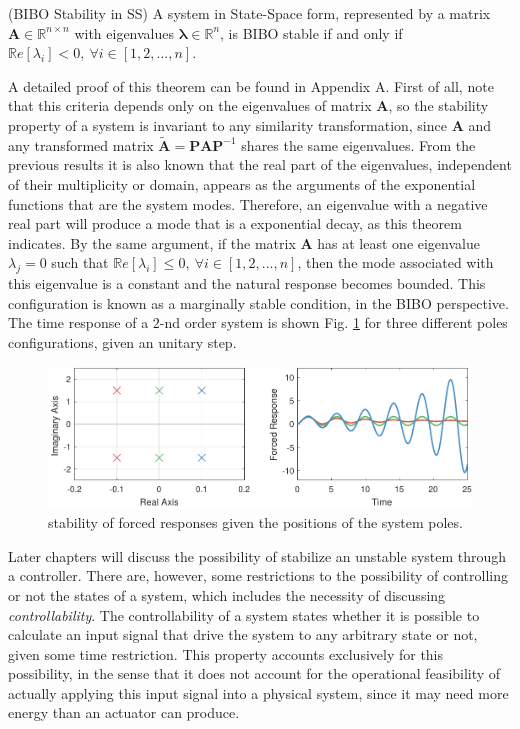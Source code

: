 \documentclass[a4paper,11pt]{book}
\numberwithin{figure}{chapter}
\numberwithin{equation}{chapter}
\numberwithin{table}{chapter}
\newtheorem{theorem}{Theorem}[chapter]
\theoremstyle{definition}
\newcounter{boxed-theorem}
\newenvironment{boxed-theorem}[1]
{\begin{shaded} \begin{theorem}{#1}}
{\end{theorem} \end{shaded}}
\newcounter{boxed-definition}
\begin{document}
\begin{boxed-theorem}{(BIBO Stability in SS)} \label{th:BIBOStab}
	A system in State-Space form, represented by a matrix $\bm{A} \in \mathbb{R}^{n \times n}$ with eigenvalues $\bm{\lambda} \in \mathbb{R}^n$, is BIBO stable if and only if $\mathbb{R}e[\lambda_i] < 0,\ \forall i \in [1,2,...,n]$.
\end{boxed-theorem}

A detailed proof of this theorem can be found in Appendix A. First of all, note that this criteria depends only on the eigenvalues of matrix $\bm{A}$, so the stability property of a system is invariant to any similarity transformation, since $\bm{A}$ and any transformed matrix $\tilde{\bm{A}} = \bm{P} \bm{A} \bm{P}^{-1}$ shares the same eigenvalues. From the previous results it is also known that the real part of the eigenvalues, independent of their multiplicity or domain, appears as the arguments of the exponential functions that are the system modes. Therefore, an eigenvalue with a negative real part will produce a mode that is a exponential decay, as this theorem indicates. By the same argument, if the matrix $\bm{A}$ has at least one eigenvalue $\lambda_j = 0$ such that $\mathbb{R}e[\lambda_i] \leq 0,\ \forall i \in [1,2,...,n]$, then the mode associated with this eigenvalue is a constant and the natural response becomes bounded. This configuration is known as a marginally stable condition, in the BIBO perspective. The time response of a $2$-nd order system is shown Fig. \ref{fig:stability01} for three different poles configurations, given an unitary step.

\begin{figure}[ht]
    \centering
    \includegraphics[width=\textwidth]{chapter2/stability01}
    \caption{stability of forced responses given the positions of the system poles.}
    \label{fig:stability01}
\end{figure} 

Later chapters will discuss the possibility of stabilize an unstable system through a controller. There are, however, some restrictions to the possibility of controlling or not the states of a system, which includes the necessity of discussing \textit{controllability}. The controllability of a system states whether it is possible to calculate an input signal that drive the system to any arbitrary state or not, given some time restriction. This property accounts exclusively for this possibility, in the sense that it does not account for the operational feasibility of actually applying this input signal into a physical system, since it may need more energy than an actuator can produce. 
\end{document}
